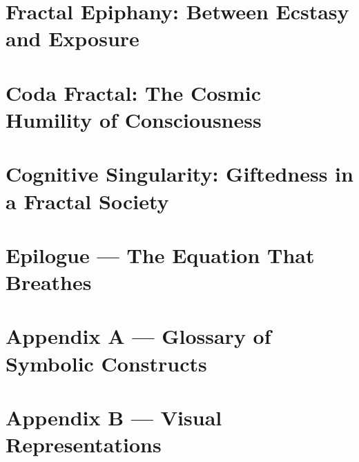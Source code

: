 \documentclass[11pt]{article}
\begin{document}
\section{Fractal Epiphany: Between Ecstasy and Exposure}


\section{Coda Fractal: The Cosmic Humility of Consciousness}


\section{Cognitive Singularity: Giftedness in a Fractal Society}


\section*{Epilogue — The Equation That Breathes}


\newpage
\section*{Appendix A — Glossary of Symbolic Constructs}


\newpage
\section*{Appendix B — Visual Representations}





\end{document}

